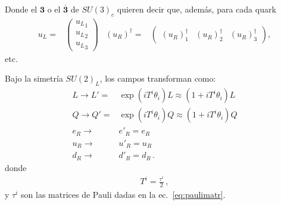 \begin{frame}
Donde el $\mathbf{3}$ o el $\overline{\mathbf{3}}$ de $SU(3)_c$ quieren decir que, además, para cada quark
\begin{align}
u_L=&
\begin{pmatrix}
  {u_{L}}_1\\
  {u_{L}}_2\\
  {u_{L}}_3
\end{pmatrix}&
  \left( u_R \right)^{\dagger}=&
  \begin{pmatrix}
    \left( u_R \right)^{\dagger}_1&
        \left( u_R \right)^{\dagger}_2&    \left( u_R \right)^{\dagger}_3
  \end{pmatrix},
\end{align}
etc.

Bajo la simetría $SU(2)_L$, los campos transforman como:
 \begin{align}
  L\to L'=&\exp(i T^i \theta_i)L\approx(1+i T^i\theta_i)L\nonumber\\
  Q\to Q'=&\exp(i T^i \theta_i)Q\approx(1+i T^i\theta_i)Q\nonumber\\
  e_R\to& e'_R=e_R\nonumber\\
  u_R\to& u'_R=u_R\nonumber\\
  d_R\to& d'_R=d_R\,.
\end{align}
donde
\begin{align}
  T^i=\frac{\tau^i}{2}\,,
\end{align}
y $\tau^i$ son las matrices de Pauli dadas en la ec.~\eqref{eq:paulimatr}.

\end{frame}



